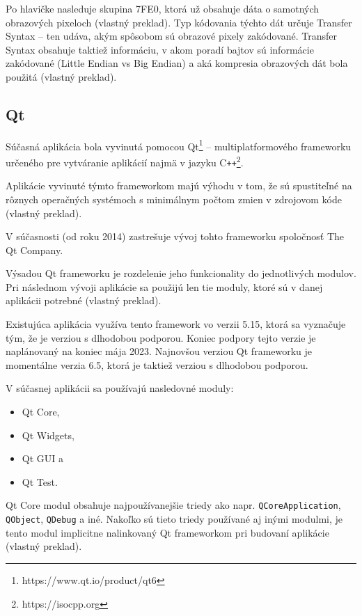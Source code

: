 Po hlavičke nasleduje skupina 7FE0, ktorá už obsahuje dáta o samotných obrazových pixeloch \cite{Varma_2012} (vlastný preklad). Typ kódovania týchto dát určuje Transfer Syntax -- ten udáva, akým spôsobom sú obrazové pixely zakódované. Transfer Syntax obsahuje taktiež informáciu, v akom poradí bajtov sú informácie zakódované (Little Endian vs Big Endian) a aká kompresia obrazových dát bola použitá \cite{dicom_transfer_syntax} (vlastný preklad).

\subsection {Qt}
Súčasná aplikácia bola vyvinutá pomocou Qt\footnote{https://www.qt.io/product/qt6} -- multiplatformového frameworku určeného pre vytváranie aplikácií najmä v jazyku C\texttt{++}\footnote{https://isocpp.org}.

\clearpage
Aplikácie vyvinuté týmto frameworkom majú výhodu v tom, že sú spustiteľné na rôznych operačných systémoch s minimálnym počtom zmien v zdrojovom kóde \cite{qt_description} (vlastný preklad).

V súčasnosti (od roku 2014) zastrešuje vývoj tohto frameworku spoločnosť The Qt Company.

Výsadou Qt frameworku je rozdelenie jeho funkcionality do jednotlivých modulov. Pri následnom vývoji aplikácie sa použijú len tie moduly, ktoré sú v danej aplikácii potrebné \cite{qt_description} (vlastný preklad).

Existujúca aplikácia využíva tento framework vo verzii 5.15, ktorá sa vyznačuje tým, že je verziou s dlhodobou podporou. Koniec podpory tejto verzie je naplánovaný na koniec mája 2023. Najnovšou verziou Qt frameworku je momentálne verzia 6.5, ktorá je taktiež verziou s dlhodobou podporou.

V súčasnej aplikácii sa používajú nasledovné moduly: 
\begin{itemize}
\item {Qt Core,}
\item {Qt Widgets,}
\item {Qt GUI a}
\item {Qt Test.}
\end{itemize}

Qt Core modul obsahuje najpoužívanejšie triedy ako napr. \texttt{QCoreApplication}, \texttt{QObject}, \texttt{QDebug} a iné. Nakoľko sú tieto triedy používané aj inými modulmi, je tento modul implicitne nalinkovaný Qt frameworkom pri budovaní aplikácie \cite{qtcore_description} (vlastný preklad).

